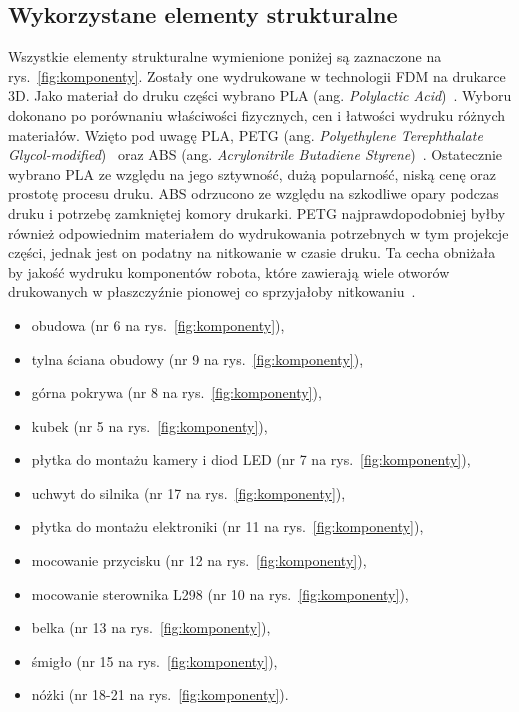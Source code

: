 \subsection{Wykorzystane elementy strukturalne}
Wszystkie elementy strukturalne wymienione poniżej są zaznaczone na rys.~\ref{fig:komponenty}. Zostały one wydrukowane w technologii FDM na drukarce 3D. Jako materiał do druku części wybrano
PLA (ang. \textit{Polylactic Acid})~\cite{plaprusa}. Wyboru dokonano po porównaniu właściwości fizycznych, cen i łatwości wydruku różnych materiałów. Wzięto pod uwagę
PLA, PETG (ang. \textit{Polyethylene Terephthalate Glycol-modified})~\cite{PETG} oraz ABS (ang. \textit{Acrylonitrile Butadiene Styrene})~\cite{ABS}. Ostatecznie wybrano PLA ze względu na jego sztywność, dużą popularność,
niską cenę oraz prostotę procesu druku. ABS odrzucono ze względu na szkodliwe opary podczas druku i potrzebę zamkniętej komory drukarki. PETG najprawdopodobniej
byłby również odpowiednim materiałem do wydrukowania potrzebnych w tym projekcje części, jednak jest on podatny na nitkowanie w czasie druku. Ta cecha
obniżała by jakość wydruku komponentów robota, które zawierają wiele otworów drukowanych w płaszczyźnie pionowej co sprzyjałoby nitkowaniu~\cite{PLA, PLA2}.
    \begin{itemize}
        \item obudowa (nr 6 na rys.~\ref{fig:komponenty}),
        \item tylna ściana obudowy (nr 9 na rys.~\ref{fig:komponenty}),
        \item górna pokrywa (nr 8 na rys.~\ref{fig:komponenty}),
        \item kubek (nr 5 na rys.~\ref{fig:komponenty}),
        \item płytka do montażu kamery i diod LED (nr 7 na rys.~\ref{fig:komponenty}),
        \item uchwyt do silnika (nr 17 na rys.~\ref{fig:komponenty}),
        \item płytka do montażu elektroniki (nr 11 na rys.~\ref{fig:komponenty}),
        \item mocowanie przycisku (nr 12 na rys.~\ref{fig:komponenty}),
        \item mocowanie sterownika L298 (nr 10 na rys.~\ref{fig:komponenty}),
        \item belka (nr 13 na rys.~\ref{fig:komponenty}),
        \item śmigło (nr 15 na rys.~\ref{fig:komponenty}),
        \item nóżki (nr 18-21 na rys.~\ref{fig:komponenty}).
    \end{itemize}\
